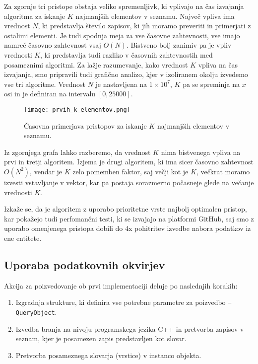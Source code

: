 \documentclass[a4paper,12pt,openright]{book}
\begin{document}
        \noindent
        Za zgornje tri pristope obstaja veliko spremenljivk, ki vplivajo na čas izvajanja algoritma za iskanje $K$ najmanjših elementov v seznamu. Največ vpliva ima vrednost $N$, ki predstavlja število zapisov, ki jih moramo preveriti in primerjati z ostalimi elementi. Je tudi spodnja meja za vse časovne zahtevnosti, vse imajo namreč časovno zahtevnost vsaj $O(N)$. Bistveno bolj zanimiv pa je vpliv vrednosti $K$, ki predstavlja tudi razliko v časovnih zahtevnostih med posameznimi algoritmi. Za lažje razumevanje, kako vrednost $K$ vpliva na čas izvajanja, smo pripravili tudi grafično analizo, kjer v izoliranem okolju izvedemo vse tri algoritme. Vrednost $N$ je nastavljena na $1 \times 10^7$, $K$ pa se spreminja na $x$ osi in je definiran na intervalu $[0, 25000]$.

        \begin{figure}[H]
            \centerline{\texttt{[image: prvih\_k\_elementov.png]}}
            \caption{Časovna primerjava pristopov za iskanje $K$ najmanjših elementov v seznamu.}
            \label{sl:k_smallest}
        \end{figure}

        \noindent
        Iz zgornjega grafa lahko razberemo, da vrednost $K$ nima bistvenega vpliva na prvi in tretji algoritem. Izjema je drugi algoritem, ki ima sicer časovno zahtevnost $O(N^2)$, vendar je $K$ zelo pomemben faktor, saj večji kot je $K$, večkrat moramo izvesti vstavljanje v vektor, kar pa postaja sorazmerno počasneje glede na večanje vrednosti $K$.

        Izkaže se, da je algoritem z uporabo prioritetne vrste najbolj optimalen pristop, kar pokažejo tudi perfomančni testi, ki se izvajajo na platformi GitHub, saj smo z uporabo omenjenega pristopa dobili do 4x pohitritev izvedbe nabora podatkov iz ene entitete.

        \subsection{Uporaba podatkovnih okvirjev}

        Akcija za poizvedovanje ob prvi implementaciji deluje po naslednjih korakih:
        \begin{enumerate}
            \item Izgradnja strukture, ki definira vse potrebne parametre za poizvedbo – {\tt QueryObject}.
            \item Izvedba branja na nivoju programskega jezika C++ in pretvorba zapisov v seznam, kjer je posamezen zapis predstavljen kot slovar.
            \item Pretvorba posameznega slovarja (vrstice) v instanco objekta.
        \end{enumerate}
\end{document}
